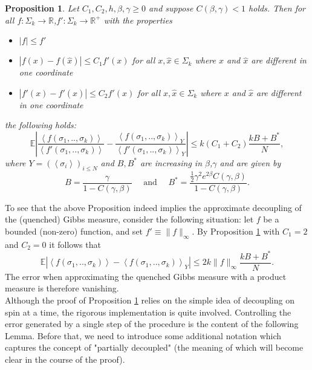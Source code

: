 \documentclass[a4paper,12pt,oneside,reqno]{amsart}
\numberwithin{equation}{section}
\newtheorem{prop}[teor]{Proposition}
\begin{document}
\begin{prop}\label{spin_ind}
Let $C_1,C_2,h,\beta,\gamma\geq 0$ and suppose $C({\beta}, \gamma)<1$ holds. Then for all $f:\Sigma_k\rightarrow {\mathbb{R}}$,$f':\Sigma_k\rightarrow {\mathbb{R}}^+$ with the properties
\begin{itemize}
\item $\left|f\right|\leq f'$ 
\item $|f(x)-f(\hat{x})|\leq C_1 f'(x)$ for all $x,\hat{x}\in \Sigma_k$ where $x$ and $\hat{x}$ are different in one coordinate  
\item $|f'(x)-f'(\hat{x})|\leq C_2 f'(x)$ for all $x,\hat{x}\in \Sigma_k$ where $x$ and $\hat{x}$ are different in one coordinate  
\end{itemize}
the following holds:
\begin{equation}\label{spin_ind_estim} {{\mathbb{E}}} \left| \frac{\left< f\left(\sigma_1,..,\sigma_k\right)\right>}{\left< f'\left(\sigma_1,..,\sigma_k \right)\right>}-\frac{\left< f\left(\sigma_1,..,\sigma_k\right)\right>_Y}{\left< f'\left(\sigma_1,..,\sigma_k\right)\right>_Y}\right|\leq k\left(C_1+C_2\right) \frac{kB+B^*}{N},\end{equation}
where $Y = \left(\left<\sigma_i\right>\right)_{i\leq N} $ and $B,B^*$ are increasing in $\beta$,$\gamma$ and are given by 
$$ B = \frac{\gamma}{1- C\left(\gamma,\beta\right)} \quad\mbox{ and }\quad B^* = \frac{\frac{1}{2}\gamma^2 e^{2\beta}C\left(\gamma,\beta\right)}{1-C\left(\gamma,\beta\right)}.$$
\end{prop}
To see that the above Proposition indeed implies the approximate decoupling of the (quenched) Gibbs measure, consider the following situation: let $f$ be a bounded (non-zero) function, and set $f' {\equiv} \|f\|_\infty$.  By Proposition \ref{spin_ind} with $C_1= 2$ and $C_2= 0$ it follows that
\begin{equation}
{{\mathbb{E}}} \left|\left< f\left(\sigma_1,..,\sigma_k\right)\right>-\left< f\left(\sigma_1,..,\sigma_k\right)\right>_Y\right|\leq 2k \|f\|_\infty \frac{kB+B^*}{N}.
\end{equation}
The error when approximating the quenched Gibbs measure with a product measure is therefore vanishing. \\

Although the proof of Proposition \ref{spin_ind} relies on the simple idea of decoupling on spin at a time, the 
rigorous implementation is quite involved. Controlling the error generated by a single step of the procedure is the content of the following Lemma. Before that, we need to introduce some additional notation which captures 
the concept of "partially decoupled" (the meaning of which will become clear in the course of the proof). 
\end{document}
